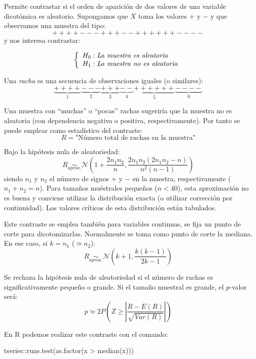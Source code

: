 \documentclass[
  10pt,
]{book}
\newenvironment{Shaded}{\begin{snugshade}}{\end{snugshade}}
\newcommand{\FunctionTok}[1]{\textcolor[rgb]{0.00,0.00,0.00}{#1}}
\newcommand{\NormalTok}[1]{#1}
\newcommand{\SpecialCharTok}[1]{\textcolor[rgb]{0.00,0.00,0.00}{#1}}
\theoremstyle{break}
\theoremstyle{nonumberplain}
\begin{document}
Permite contrastar si el orden de aparición de dos valores de una variable dicotómica es aleatorio.
Supongamos que \(X\) toma los valores \(+\) y \(-\) y que observamos una muestra del tipo:
\[++++---+++--++++++----\]
y nos interesa contrastar:

\[\left\{ \begin{array}[c]{l}
    H_0:\mathit{La\ muestra\ es\ aleatoria}\\
    H_1:\mathit{La\ muestra\ no\ es\ aleatoria}
\end{array}\right.\]

Una \emph{racha} es una secuencia de observaciones iguales (o similares):
\[\underbrace{++++}_{1}\underbrace{---}_{2}\underbrace{+++}_{3}
\underbrace{--}_{4}\underbrace{++++++}_{5}\underbrace{----}_{6}\]

Una muestra con ``muchas'' o ``pocas'' rachas sugeriría que la muestra no es aleatoria (con dependencia negativa o positiva, respectivamente).
Por tanto se puede emplear como estadístico del contraste:
\[R=\text{"Número total de rachas en la muestra"}\]

Bajo la hipótesis nula de aleatoriedad:
\[R\underset{aprox.}{\sim} \mathcal{N}\left(  1+\frac{2n_{1}n_{2}}{n},
\frac{2n_{1}n_{2}(2n_{1}n_{2}-n)}{n^{2}(n-1)}\right)\]
siendo \(n_{1}\) y \(n_{2}\) el número de signos \(+\) y \(-\) en la muestra, respectivamente (\(n_{1}+n_{2}=n\)).
Para tamaños muéstrales pequeños (\(n<40\)), esta aproximación no es buena y conviene utilizar la distribución exacta (o utilizar corrección por continuidad).
Los valores críticos de esta distribución están tabulados.

Este contraste se emplea también para variables continuas, se fija un punto de corte para dicotomizarlas.
Normalmente se toma como punto de corte la mediana.
En ese caso, si \(k=n_{1}\) (\(\simeq n_{2}\)):
\[R\underset{aprox.}{\sim} \mathcal{N}\left(  k+1,\frac{k(k-1)}{2k-1}\right)\]

Se rechaza la hipótesis nula de aleatoriedad si el número de rachas es significativamente pequeño o grande.
Si el tamaño muestral es grande, el \(p\)-valor será:
\[p \simeq 2 P\left( Z \geq \left\vert 
\frac{R-E(R)}{\sqrt{Var(R)}} \right\vert \right)\]

En R podemos realizar este contraste con el comando:

\begin{Shaded}
\begin{Highlighting}[]
\NormalTok{tseries}\SpecialCharTok{::}\FunctionTok{runs.test}\NormalTok{(}\FunctionTok{as.factor}\NormalTok{(x }\SpecialCharTok{\textgreater{}} \FunctionTok{median}\NormalTok{(x)))}
\end{Highlighting}
\end{Shaded}
\end{document}
